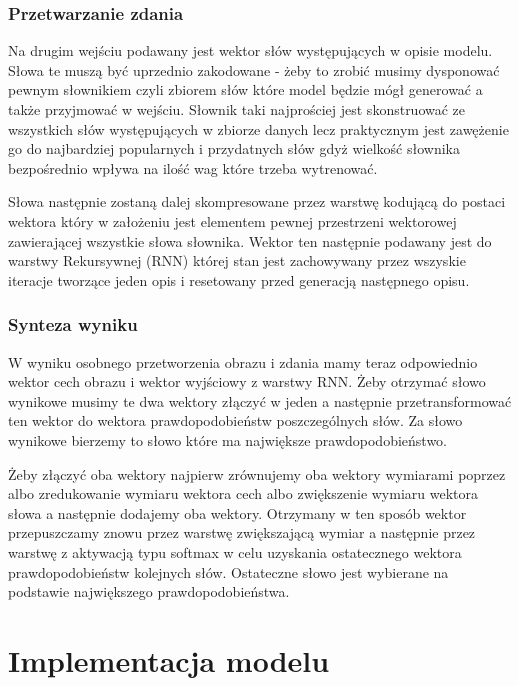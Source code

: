 \subsubsection{Przetwarzanie zdania}
Na drugim wejściu podawany jest wektor słów występujących w opisie modelu. Słowa te muszą być uprzednio zakodowane - żeby to zrobić musimy dysponować pewnym słownikiem czyli zbiorem słów które model będzie mógł generować a także przyjmować w wejściu. Słownik taki najprościej jest skonstruować ze wszystkich słów występujących w zbiorze danych lecz praktycznym jest zawężenie go do najbardziej popularnych i przydatnych słów gdyż wielkość słownika bezpośrednio wpływa na ilość wag które trzeba wytrenować.

Słowa następnie zostaną dalej skompresowane przez warstwę kodującą do postaci wektora który w założeniu jest elementem pewnej przestrzeni wektorowej zawierającej wszystkie słowa słownika. Wektor ten następnie podawany jest do warstwy Rekursywnej (RNN) której stan jest zachowywany przez wszyskie iteracje tworzące jeden opis i resetowany przed generacją następnego opisu.
\subsubsection{Synteza wyniku}
W wyniku osobnego przetworzenia obrazu i zdania mamy teraz odpowiednio wektor cech obrazu i wektor wyjściowy z warstwy RNN. Żeby otrzymać słowo wynikowe musimy te dwa wektory złączyć w jeden a następnie przetransformować ten wektor do wektora prawdopodobieństw poszczególnych słów. Za słowo wynikowe bierzemy to słowo które ma największe prawdopodobieństwo.

Żeby złączyć oba wektory najpierw zrównujemy oba wektory wymiarami poprzez albo zredukowanie wymiaru wektora cech albo zwiększenie wymiaru wektora słowa a następnie dodajemy oba wektory. Otrzymany w ten sposób wektor przepuszczamy znowu przez warstwę zwiększającą wymiar a następnie przez warstwę z aktywacją typu softmax w celu uzyskania ostatecznego wektora prawdopodobieństw kolejnych słów. Ostateczne słowo jest wybierane na podstawie największego prawdopodobieństwa.

\section{Implementacja modelu}
